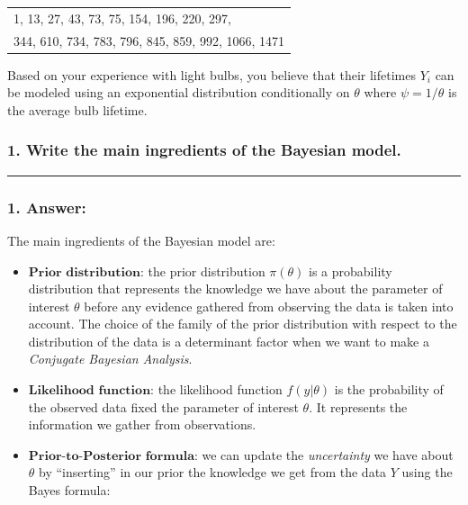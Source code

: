 \documentclass[
]{article}
\begin{document}
\begin{table}[!h]
\centering
\begin{tabular}{l}
1, 13, 27, 43, 73, 75, 154, 196, 220, 297,\\
344, 610, 734, 783, 796, 845, 859, 992, 1066, 1471
\end{tabular}
\end{table}

Based on your experience with light bulbs, you believe that their
lifetimes \(Y_i\) can be modeled using an exponential distribution
conditionally on \(\theta\) where \(\psi = 1/\theta\) is the average
bulb lifetime.

\hypertarget{write-the-main-ingredients-of-the-bayesian-model.}{%
\subsubsection{1. Write the main ingredients of the Bayesian
model.}\label{write-the-main-ingredients-of-the-bayesian-model.}}

\begin{center}\rule{0.5\linewidth}{0.5pt}\end{center}

\hypertarget{answer-4}{%
\subsubsection{1. Answer:}\label{answer-4}}

The main ingredients of the Bayesian model are:

\begin{itemize}
\item
  \(\textbf{Prior distribution}\): the prior distribution
  \(\pi(\theta)\) is a probability distribution that represents the
  knowledge we have about the parameter of interest \(\theta\) before
  any evidence gathered from observing the data is taken into account.
  The choice of the family of the prior distribution with respect to the
  distribution of the data is a determinant factor when we want to make
  a \emph{Conjugate Bayesian Analysis}.
\item
  \(\textbf{Likelihood function}\): the likelihood function
  \(f(y | \theta)\) is the probability of the observed data fixed the
  parameter of interest \(\theta\). It represents the information we
  gather from observations.
\item
  \(\textbf{Prior-to-Posterior formula}\): we can update the
  \emph{uncertainty} we have about \(\theta\) by ``inserting'' in our
  prior the knowledge we get from the data \(Y\) using the Bayes
  formula:
\end{itemize}
\end{document}
